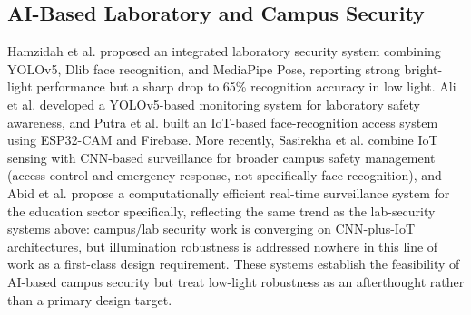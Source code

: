 \documentclass[conference]{IEEEtran}
\begin{document}
\subsection{AI-Based Laboratory and Campus Security}
Hamzidah et al. \cite{hamzidah2026} proposed an integrated
laboratory security system combining YOLOv5, Dlib face
recognition, and MediaPipe Pose, reporting strong bright-light
performance but a sharp drop to 65\% recognition accuracy in low
light. Ali et al. \cite{ali2022} developed a YOLOv5-based
monitoring system for laboratory safety awareness, and Putra et
al. \cite{putra2023} built an IoT-based face-recognition access
system using ESP32-CAM and Firebase. More recently, Sasirekha et
al. \cite{smartcampus2024} combine IoT sensing with CNN-based
surveillance for broader campus safety management (access
control and emergency response, not specifically face
recognition), and Abid et al. \cite{abid2024} propose a
computationally efficient real-time surveillance system for the
education sector specifically, reflecting the same trend as the
lab-security systems above: campus/lab security work is converging on
CNN-plus-IoT architectures, but illumination robustness is
addressed nowhere in this line of work as a first-class design
requirement. These systems establish the
feasibility of AI-based campus security but treat low-light
robustness as an afterthought rather than a primary design
target.
\end{document}
